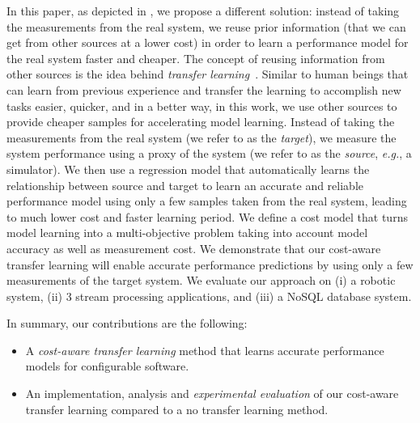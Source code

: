 In this paper, as depicted in , we propose a different solution: instead of taking the measurements from the real system, we reuse prior information (that we can get from other sources at a lower cost) in order to learn a performance model for the real system faster and cheaper. The concept of reusing information from other sources is the idea behind \emph{transfer learning}~\cite{torrey2009transfer,pan2010survey}. Similar to human beings that can learn from previous experience and transfer the learning to accomplish new tasks easier, quicker, and in a better way, in this work, we use other sources to provide cheaper samples for accelerating model learning. Instead of taking the measurements from the real system (we refer to as the \emph{target}), we measure the system performance using a proxy of the system (we refer to as the \emph{source}, \emph{e.g.}, a simulator). We then use a regression model that automatically learns the relationship between source and target to learn an accurate and reliable performance model using only a few samples taken from the real system, leading to much lower cost and faster learning period. 
We define a cost model that turns model learning into a multi-objective problem taking into account model accuracy as well as measurement cost. We demonstrate that our cost-aware transfer learning will enable accurate performance predictions by using only a few measurements of the target system. We evaluate our approach on (i) a robotic system, (ii) 3 stream processing applications, and (iii) a NoSQL database system. %

In summary, our contributions are the following:
\begin{itemize}
	\item A \emph{cost-aware transfer learning} method that learns accurate performance models for configurable software.
	\item An implementation, analysis and \emph{experimental evaluation} of our cost-aware transfer learning compared to a no transfer learning method.
\end{itemize}


